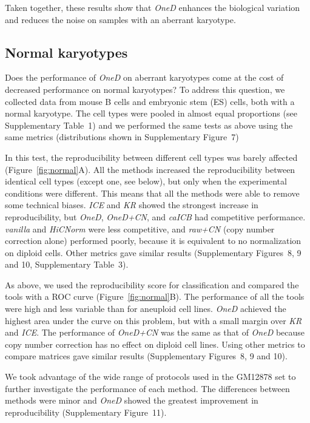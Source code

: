 \documentclass[a4,center,fleqn]{NAR}
\begin{document}
Taken together, these results show that \textit{OneD} enhances the
biological variation and reduces the noise on samples with an aberrant
karyotype.




\subsection{Normal karyotypes}

Does the performance of \textit{OneD} on aberrant karyotypes come at the
cost of decreased performance on normal karyotypes? To address this
question, we collected data from mouse B cells and embryonic stem (ES)
cells, both with a normal karyotype. The cell types were pooled in almost
equal proportions (see Supplementary Table~1) and we performed the same
tests as above using the same metrics (distributions shown in
Supplementary Figure~7)

In this test, the reproducibility between different cell types was barely
affected (Figure~\ref{fig:normal}A). All the methods increased the
reproducibility between identical cell types (except one, see below), but
only when the experimental conditions were different. This means that all
the methods were able to remove some technical biases. \textit{ICE} and
\textit{KR} showed the strongest increase in reproducibility, but
\textit{OneD}, \textit{OneD+CN}, and \textit{caICB} had competitive
performance. \textit{vanilla} and \textit{HiCNorm} were less competitive, and
\textit{raw+CN} (copy number correction alone) performed poorly, because
it is equivalent to no normalization on diploid cells. Other metrics gave
similar results (Supplementary Figures~8, 9 and 10, Supplementary Table~3).

As above, we used the reproducibility score for classification and
compared the tools with a ROC curve (Figure~\ref{fig:normal}B). The
performance of all the tools were high and less variable than for
aneuploid cell lines. \textit{OneD} achieved the highest area under the
curve on this problem, but with a small margin over \textit{KR} and
\textit{ICE}. The performance of \textit{OneD+CN} was the same as that of
\textit{OneD} because copy number correction has no effect on diploid cell
lines. Using other metrics to compare matrices gave similar results
(Supplementary Figures~8, 9 and 10).

We took advantage of the wide range of protocols used in the GM12878 set to
further investigate the performance of each method. The differences between
methods were minor and \textit{OneD} showed the greatest improvement in
reproducibility (Supplementary Figure~11).
\end{document}
